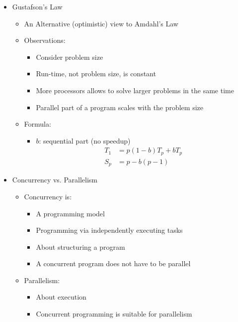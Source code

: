 \documentclass[a4paper]{article}
\begin{document}
\begin{itemize}
\begin{itemize}
\begin{itemize}
\end{itemize}
\end{itemize}
\item Gustafson's Law
\begin{itemize}
\item An Alternative (optimistic) view to Amdahl's Law
\item Observations:
\begin{itemize}
\item Consider problem size
\item Run-time, not problem size, is constant
\item More processors allows to solve larger problems in the same time
\item Parallel part of a program scales with the problem size
\end{itemize}
\item Formula:
\begin{itemize}
\item $b$: sequential part (no speedup)
\begin{align*}
T_1&=p(1-b)T_p+bT_p\\
S_p&=p-b(p-1)
\end{align*}
\end{itemize}
\end{itemize}
\item Concurrency vs. Parallelism
\begin{itemize}
\item Concurrency is:
\begin{itemize}
\item A programming model
\item Programming via independently executing tasks
\item About structuring a program 
\item A concurrent program does not have to be parallel
\end{itemize}
\item Parallelism:
\begin{itemize}
\item About execution
\item Concurrent programming is suitable for parallelism
\end{itemize}
\end{itemize}



\end{itemize}
\end{document}
